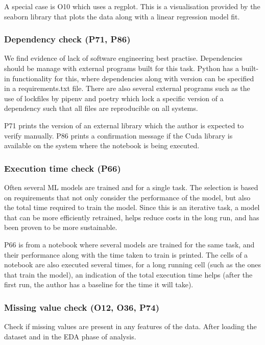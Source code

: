 A special case is O10 which uses a regplot. This is a visualisation provided by the seaborn library that plots the data along with a linear regression model fit.

\subsubsection{Dependency check (P71, P86)}

We find evidence of lack of software engineering best practise. Dependencies should be manage with external programs built for this task. Python has a built-in functionality for this, where dependencies along with version can be specified in a requirements.txt file. There are also several external programs such as the use of lockfiles by pipenv and poetry which lock a specific version of a dependency such that all files are reproducible on all systems.

P71 prints the version of an external library which the author is expected to verify manually. P86 prints a confirmation message if the Cuda library is available on the system where the notebook is being executed.

\subsubsection{Execution time check (P66)}

Often several ML models are trained and for a single task. The selection is based on requirements that not only consider the performance of the model, but also the total time required to train the model. Since this is an iterative task, a model that can be more efficiently retrained, helps reduce costs in the long run, and has been proven to be more sustainable.

P66 is from a notebook where several models are trained for the same task, and their performance along with the time taken to train is printed. The cells of a notebook are also executed several times, for a long running cell (such as the ones that train the model), an indication of the total execution time helps (after the first run, the author has a baseline for the time it will take).

\subsubsection{Missing value check (O12, O36, P74)}

Check if missing values are present in any features of the data. After loading the dataset and in the EDA phase of analysis.

